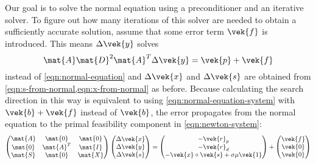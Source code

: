 Our goal is to solve the normal equation using a preconditioner and an iterative solver.
To figure out how many iterations of this solver are needed to obtain a sufficiently accurate solution, assume that some error term \(\vek{f}\) is introduced.
This means \(\Delta\vek{y}\) solves
\begin{equation}
 \mat{A} \mat{D}^2 \mat{A}^T \Delta\vek{y} = \vek{p} + \vek{f}
\end{equation}
instead of \cref{eqn:normal-equation} and \(\Delta\vek{x}\) and \(\Delta\vek{s}\) are obtained from \cref{eqn:s-from-normal,eqn:x-from-normal} as before.
Because calculating the search direction in this way is equivalent to using \cref{eqn:normal-equation-system} with \(\vek{b} + \vek{f}\) instead of \(\vek{b}\),
the error propagates from the normal equation to the primal feasibility component in \cref{eqn:newton-system}:
\begin{equation}
  \begin{pmatrix}
    \mat{A} & \mat{0}   & \mat{0} \\
    \mat{0} & \mat{A}^T & \mat{I} \\
    \mat{S} & \mat{0}   & \mat{X} \\
  \end{pmatrix}
  \begin{pmatrix} \Delta\vek{x} \\ \Delta\vek{y} \\ \Delta\vek{s} \end{pmatrix}
  =
  \begin{pmatrix} -\vek{r}_p \\ -\vek{r}_d \\ -\vek{x} \circ \vek{s} + \sigma \mu \vek{1} \end{pmatrix}
  +
  \begin{pmatrix} \vek{f} \\ \vek{0} \\ \vek{0} \end{pmatrix}
\end{equation}

